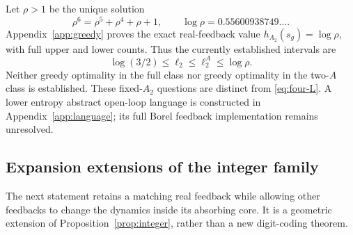 \documentclass[11pt,reqno]{amsart}
\numberwithin{equation}{section}
\theoremstyle{definition}
\begin{document}
Let $\rho>1$ be the unique solution
\begin{equation}\label{eq:rho}
 \rho^6=\rho^5+\rho^4+\rho+1,
 \qquad\log\rho=0.55600938749\ldots.
\end{equation}
Appendix~\ref{app:greedy} proves the exact real-feedback value
$h_{A_2}(s_g)=\log\rho$, with full upper and lower counts.
Thus the currently established intervals are
\begin{equation}\label{eq:four-even}
 \log(3/2)\le\ell_2\le\ell_2^A\le\log\rho.
\end{equation}
Neither greedy optimality in the full class nor greedy optimality
in the two-$A$ class is established. These fixed-$A_2$ questions
are distinct from \eqref{eq:four-L}. A lower entropy abstract
open-loop language is constructed in Appendix~\ref{app:language};
its full Borel feedback implementation remains unresolved.


\subsection{Expansion extensions of the integer family}\label{sec:extensions}
The next statement retains a matching real feedback while allowing other
feedbacks to change the dynamics inside its absorbing core. It is a
geometric extension of Proposition~\ref{prop:integer}, rather than a
new digit-coding theorem.
\end{document}
